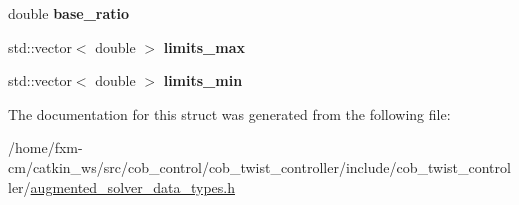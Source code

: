 \begin{DoxyCompactItemize}
\item 
\hypertarget{structAugmentedSolverParams_a7823582a731e8423a279db497a1a69d0}{double {\bfseries base\-\_\-ratio}}\label{structAugmentedSolverParams_a7823582a731e8423a279db497a1a69d0}

\item 
\hypertarget{structAugmentedSolverParams_a0755a09eb3ba40b0b97d4d41118b9e3b}{std\-::vector$<$ double $>$ {\bfseries limits\-\_\-max}}\label{structAugmentedSolverParams_a0755a09eb3ba40b0b97d4d41118b9e3b}

\item 
\hypertarget{structAugmentedSolverParams_a9b496c197c766e9cc398edf0deb429c2}{std\-::vector$<$ double $>$ {\bfseries limits\-\_\-min}}\label{structAugmentedSolverParams_a9b496c197c766e9cc398edf0deb429c2}

\end{DoxyCompactItemize}


The documentation for this struct was generated from the following file\-:\begin{DoxyCompactItemize}
\item 
/home/fxm-\/cm/catkin\-\_\-ws/src/cob\-\_\-control/cob\-\_\-twist\-\_\-controller/include/cob\-\_\-twist\-\_\-controller/\hyperlink{augmented__solver__data__types_8h}{augmented\-\_\-solver\-\_\-data\-\_\-types.\-h}\end{DoxyCompactItemize}
